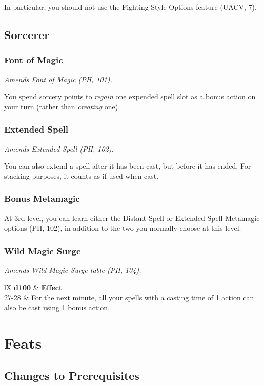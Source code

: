 \documentclass[letterpaper,twocolumn,openany,nodeprecatedcode]{dndbook}
\begin{document}
In particular, you should not use the Fighting Style Options feature (UACV, 7).


\subsection{Sorcerer}

\subsubsection{Font of Magic}
\textit{Amends Font of Magic (PH, 101).}

You spend sorcery points to \textit{regain} one expended spell slot as a bonus action on your turn (rather than \textit{creating} one).

\subsubsection{Extended Spell}
\textit{Amends Extended Spell (PH, 102).}

You can also extend a spell after it has been cast, but before it has ended. For stacking purposes, it counts as if used when cast.

\subsubsection{Bonus Metamagic}
At 3rd level, you can learn either the Distant Spell or Extended Spell Metamagic options (PH, 102), in addition to the two you normally choose at this level.

\subsubsection{Wild Magic Surge}
\textit{Amends Wild Magic Surge table (PH, 104).}

\begin{DndTable}[]{lX}
    \textbf{d100} & \textbf{Effect} \\
    27-28 & For the next minute, all your spells with a casting time of 1 action can also be cast using 1 bonus action.
\end{DndTable}




\section{Feats}

\subsection{Changes to Prerequisites}
\end{document}

